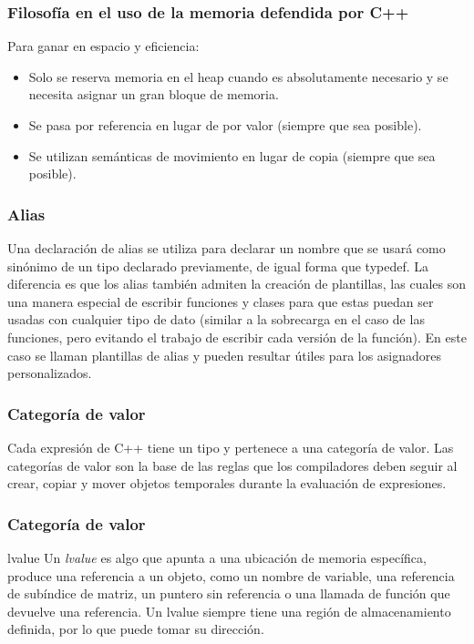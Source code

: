 \documentclass{beamer}
\begin{document}
	\begin{frame}
		\frametitle{Filosofía en el uso de la memoria defendida por C++}
		Para ganar en espacio y eficiencia:
		\begin{itemize}
			\item Solo se reserva memoria en el heap cuando es absolutamente necesario y se necesita asignar un gran bloque de memoria.
			
			\item Se pasa por referencia en lugar de por valor (siempre que sea posible).
			
			\item Se utilizan semánticas de movimiento en lugar de copia (siempre que sea posible).
		\end{itemize}
	\end{frame}

	\begin{frame}
		\frametitle{Alias}
		Una declaración de alias se utiliza para declarar un nombre que se usará como sinónimo de un tipo declarado previamente, de igual forma que typedef. La diferencia es que los alias tambi\'en admiten la creaci\'on de plantillas, las cuales son una manera especial de escribir funciones y clases para que estas puedan ser usadas con cualquier tipo de dato (similar a la sobrecarga en el caso de las funciones, pero evitando el trabajo de escribir cada versión de la función). En este caso se llaman plantillas de alias y pueden resultar útiles para los asignadores personalizados.
	\end{frame}

	\begin{frame}
		\frametitle{Categor\'ia de valor}
		Cada expresión de C++ tiene un tipo y pertenece a una categoría de valor. Las categorías de valor son la base de las reglas que los compiladores deben seguir al crear, copiar y mover objetos temporales durante la evaluación de expresiones.
	\end{frame}

	\begin{frame}
		\frametitle{Categor\'ia de valor}
		\begin{block}{lvalue}
			Un \textit{lvalue} es algo que apunta a una ubicación de memoria específica, produce una referencia a un objeto, como un nombre de variable, una referencia de subíndice de matriz, un puntero sin referencia o una llamada de función que devuelve una referencia. Un lvalue siempre tiene una región de almacenamiento definida, por lo que puede tomar su dirección.
		\end{block}
	\end{frame}
\end{document}
